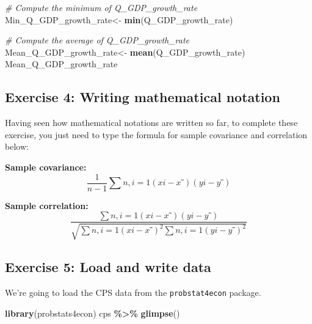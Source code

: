 \documentclass[
]{article}
\newenvironment{Shaded}{\begin{snugshade}}{\end{snugshade}}
\newcommand{\CommentTok}[1]{\textcolor[rgb]{0.56,0.35,0.01}{\textit{#1}}}
\newcommand{\FunctionTok}[1]{\textcolor[rgb]{0.13,0.29,0.53}{\textbf{#1}}}
\newcommand{\NormalTok}[1]{#1}
\newcommand{\OtherTok}[1]{\textcolor[rgb]{0.56,0.35,0.01}{#1}}
\newcommand{\SpecialCharTok}[1]{\textcolor[rgb]{0.81,0.36,0.00}{\textbf{#1}}}
\begin{document}
\begin{Shaded}
\begin{Highlighting}[]
\CommentTok{\# Compute the minimum of Q\_GDP\_growth\_rate}
\NormalTok{Min\_Q\_GDP\_growth\_rate}\OtherTok{\textless{}{-}} \FunctionTok{min}\NormalTok{(Q\_GDP\_growth\_rate)}


\CommentTok{\# Compute the average of Q\_GDP\_growth\_rate}
\NormalTok{Mean\_Q\_GDP\_growth\_rate}\OtherTok{\textless{}{-}} \FunctionTok{mean}\NormalTok{(Q\_GDP\_growth\_rate)}
\NormalTok{Mean\_Q\_GDP\_growth\_rate}
\end{Highlighting}
\end{Shaded}

\subsection{Exercise 4: Writing mathematical
notation}\label{exercise-4-writing-mathematical-notation}

Having seen how mathematical notations are written so far, to complete
these exercise, you just need to type the formula for sample covariance
and correlation below:

\textbf{Sample covariance:} \[\frac{1}{n-1}{∑n,i=1​(xi​−xˉ)(yi​−yˉ​)}\]

\textbf{Sample correlation:}
\[\frac{∑n,i=1​(xi​−xˉ)(yi​−yˉ​)}{\sqrt{∑n,i=1​(xi​−xˉ)^2∑n,i=1​(yi​−yˉ​)^2}}\]

\subsection{Exercise 5: Load and write
data}\label{exercise-5-load-and-write-data}

We're going to load the CPS data from the \texttt{probstat4econ}
package.

\begin{Shaded}
\begin{Highlighting}[]
\FunctionTok{library}\NormalTok{(probstats4econ)}
\NormalTok{cps }\SpecialCharTok{\%\textgreater{}\%} \FunctionTok{glimpse}\NormalTok{()}
\end{Highlighting}
\end{Shaded}
\end{document}
